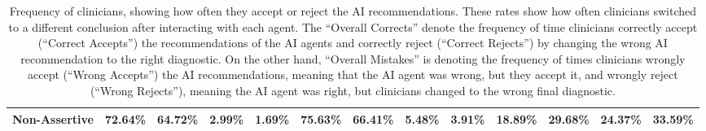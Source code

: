 \begin{table}[btpb]
{\begin{tabular}{|c|cc|cc|cc|cc|cc|ll|}
\textbf{Non-Assertive}               & \multicolumn{1}{c|}{72.64\%}                        & {\color[HTML]{009901} 64.72\%} & \multicolumn{1}{c|}{{\color[HTML]{009901} 2.99\%}} & {\color[HTML]{9A0000} 1.69\%} & \multicolumn{1}{c|}{75.63\%}                        & {\color[HTML]{009901} 66.41\%} & \multicolumn{1}{c|}{{\color[HTML]{9A0000} 5.48\%}} & {\color[HTML]{009901} 3.91\%} & \multicolumn{1}{c|}{18.89\%}                        & 29.68\%                        & \multicolumn{1}{l|}{24.37\%}                        & {\color[HTML]{009901} 33.59\%} \\ \hline
\end{tabular}%
}
\caption[]{Frequency of clinicians, showing how often they accept or reject the AI recommendations. These rates show how often clinicians switched to a different conclusion after interacting with each agent. The ``Overall Corrects'' denote the frequency of time clinicians correctly accept (``Correct Accepts'') the recommendations of the AI agents and correctly reject (``Correct Rejects'') by changing the wrong AI recommendation to the right diagnostic. On the other hand, ``Overall Mistakes'' is denoting the frequency of times clinicians wrongly accept (``Wrong Accepts'') the AI recommendations, meaning that the AI agent was wrong, but they accept it, and wrongly reject (``Wrong Rejects''), meaning the AI agent was right, but clinicians changed to the wrong final diagnostic.}
\label{tab:tab014}
\end{table}